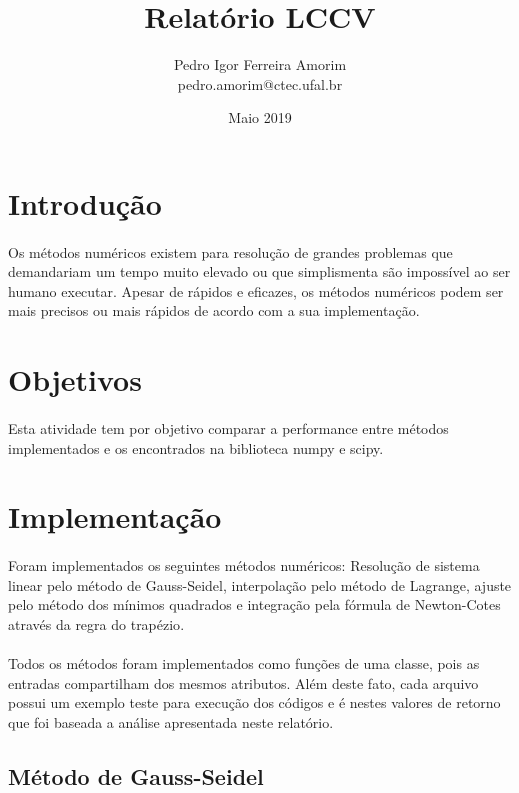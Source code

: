 \documentclass{article}
\title{Relatório LCCV}
\author{Pedro Igor Ferreira Amorim \\ {pedro.amorim@ctec.ufal.br}}
\date{Maio 2019}
\begin{document}
\maketitle

\section{Introdução}
\paragraph{} Os métodos numéricos existem para resolução de grandes problemas que demandariam um tempo muito elevado ou que simplismenta são impossível ao ser humano executar. Apesar de rápidos e eficazes, os métodos numéricos podem ser mais precisos ou mais rápidos de acordo com a sua implementação. 

\section{Objetivos}
\paragraph{} Esta atividade tem por objetivo comparar a performance entre métodos implementados e os encontrados na biblioteca numpy e scipy.

\section{Implementação}
\paragraph{} Foram implementados os seguintes métodos numéricos: Resolução de sistema linear pelo método de Gauss-Seidel, interpolação pelo método de Lagrange, ajuste pelo método dos mínimos quadrados e integração pela fórmula de Newton-Cotes através da regra do trapézio\cite{DUMMY:1}. 
\paragraph{} Todos os métodos foram implementados como funções de uma classe, pois as entradas compartilham dos mesmos atributos. Além deste fato, cada arquivo possui um exemplo teste para execução dos códigos e é nestes valores de retorno que foi baseada a análise apresentada neste relatório.


\subsection{Método de Gauss-Seidel}
\end{document}
